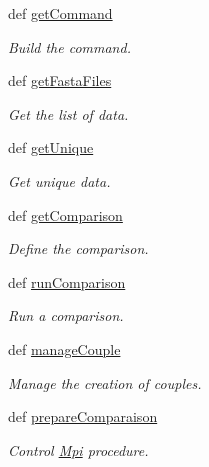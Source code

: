 \begin{DoxyCompactItemize}
def \hyperlink{classirna_1_1iRNA__pred_1_1Comparison_1_1Comparaison_a1750455c9cda308484b95b3c84970ffc}{get\-Command}
\begin{DoxyCompactList}\small\item\em \-Build the command. \end{DoxyCompactList}\item 
def \hyperlink{classirna_1_1iRNA__pred_1_1Comparison_1_1Comparaison_a7a6cca37b2f54de1ad7d28b5cd198f35}{get\-Fasta\-Files}
\begin{DoxyCompactList}\small\item\em \-Get the list of data. \end{DoxyCompactList}\item 
def \hyperlink{classirna_1_1iRNA__pred_1_1Comparison_1_1Comparaison_a06df361ecdde3a8f41e33d549afeecdc}{get\-Unique}
\begin{DoxyCompactList}\small\item\em \-Get unique data. \end{DoxyCompactList}\item 
def \hyperlink{classirna_1_1iRNA__pred_1_1Comparison_1_1Comparaison_a796e5f1702ab20ca34d78a0dc9298115}{get\-Comparison}
\begin{DoxyCompactList}\small\item\em \-Define the comparison. \end{DoxyCompactList}\item 
def \hyperlink{classirna_1_1iRNA__pred_1_1Comparison_1_1Comparaison_af1a4b7fc27516a1b65772b426a89d93c}{run\-Comparison}
\begin{DoxyCompactList}\small\item\em \-Run a comparison. \end{DoxyCompactList}\item 
def \hyperlink{classirna_1_1iRNA__pred_1_1Comparison_1_1Comparaison_addb86adfe79b1096a1c69e462a8aa47d}{manage\-Couple}
\begin{DoxyCompactList}\small\item\em \-Manage the creation of couples. \end{DoxyCompactList}\item 
def \hyperlink{classirna_1_1iRNA__pred_1_1Comparison_1_1Comparaison_aa70907d2d4a5763599c2cffd1a83a847}{prepare\-Comparaison}
\begin{DoxyCompactList}\small\item\em \-Control \hyperlink{namespaceirna_1_1iRNA__pred_1_1Mpi}{\-Mpi} procedure. \end{DoxyCompactList}\end{DoxyCompactItemize}
